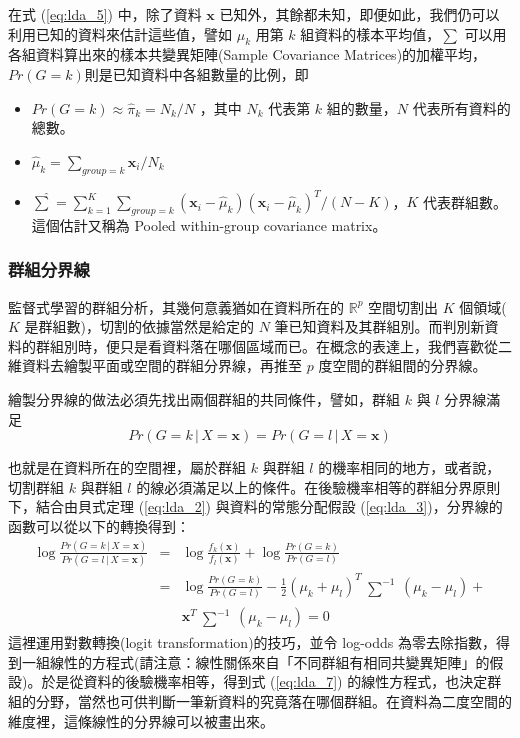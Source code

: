在式 (\ref{eq:lda_5}) 中，除了資料 $\mathbf{x}$ 已知外，其餘都未知，即便如此，我們仍可以利用已知的資料來估計這些值，譬如 $\mu_k$ 用第 $k$ 組資料的樣本平均值，$\sum$ 可以用各組資料算出來的樣本共變異矩陣(Sample Covariance Matrices)的加權平均，$Pr(G = k)$則是已知資料中各組數量的比例，即
\begin{itemize}
\item
$Pr(G = k) \approx \hat{\pi}_k = N_k/N$ ，其中 $N_k$ 代表第 $k$ 組的數量，$N$ 代表所有資料的總數。
\item
$\hat{\mu}_k = \sum_{group = k} \mathbf{x}_i/N_k$
\item
$\hat{\sum} = \sum_{k = 1}^K \sum_{group = k} (\mathbf{x}_i - \hat{\mu}_k)(\mathbf{x}_i - \hat{\mu}_k)^T/(N - K)$，$K$ 代表群組數。這個估計又稱為 Pooled within-group covariance matrix。
\end{itemize}
\subsubsection{群組分界線}

監督式學習的群組分析，其幾何意義猶如在資料所在的 $\mathbb{R}^p$ 空間切割出 $K$ 個領域($K$ 是群組數)，切割的依據當然是給定的 $N$ 筆已知資料及其群組別。而判別新資料的群組別時，便只是看資料落在哪個區域而已。在概念的表達上，我們喜歡從二維資料去繪製平面或空間的群組分界線，再推至 $p$ 度空間的群組間的分界線。

繪製分界線的做法必須先找出兩個群組的共同條件，譬如，群組 $k$ 與 $l$ 分界線滿足
\begin{equation}\label{eq:lda_6}
Pr(G = k\,|\,X = \mathbf{x}) = Pr(G = l\,|\,X = \mathbf{x}) 
\end{equation}

也就是在資料所在的空間裡，屬於群組 $k$ 與群組 $l$ 的機率相同的地方，或者說，切割群組 $k$ 與群組 $l$ 的線必須滿足以上的條件。在後驗機率相等的群組分界原則下，結合由貝式定理 (\ref{eq:lda_2}) 與資料的常態分配假設 (\ref{eq:lda_3})，分界線的函數可以從以下的轉換得到：
\begin{eqnarray}
\log \frac{Pr(G = k\,|\,X = \mathbf{x})}{Pr(G = l\,|\,X = \mathbf{x})} 
& = &
\log \frac{f_k(\mathbf{x})}{f_l(\mathbf{x})} + \log \frac{Pr(G = k)}{Pr(G = l)} \nonumber \\
& = & 
\log \frac{Pr(G = k)}{Pr(G = l)} - \frac{1}{2}(\mu_k + \mu_l)^T \begin{matrix} \sum^{-1} \end{matrix}(\mu_k - \mu_l) + \nonumber \\
&  &
\mathbf{x}^T \begin{matrix} \sum^{-1} \end{matrix}(\mu_k - \mu_l) = 0 \label{eq:lda_7}
\end{eqnarray}
這裡運用對數轉換(logit transformation)的技巧，並令 log-odds 為零去除指數，得到一組線性的方程式(請注意：線性關係來自「不同群組有相同共變異矩陣」的假設)。於是從資料的後驗機率相等，得到式 (\ref{eq:lda_7}) 的線性方程式，也決定群組的分野，當然也可供判斷一筆新資料的究竟落在哪個群組。在資料為二度空間的維度裡，這條線性的分界線可以被畫出來。
